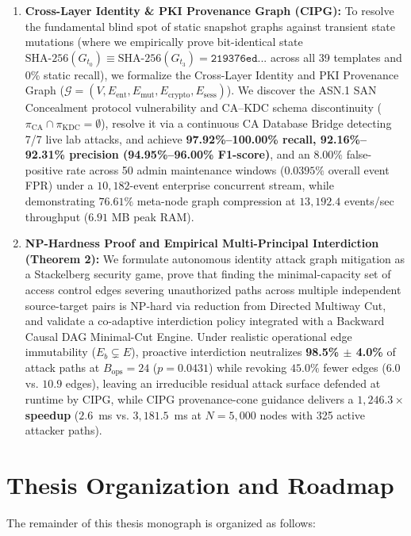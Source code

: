 \begin{enumerate}
    \item \textbf{Cross-Layer Identity \& PKI Provenance Graph (CIPG):} To resolve the fundamental blind spot of static snapshot graphs against transient state mutations (where we empirically prove bit-identical state $\text{SHA-256}(G_{t_0}) \equiv \text{SHA-256}(G_{t_3}) = \texttt{219376ed...}$ across all 39 templates and 0\% static recall), we formalize the Cross-Layer Identity and PKI Provenance Graph ($\mathcal{G} = (V, E_{\text{ent}}, E_{\text{mut}}, E_{\text{crypto}}, E_{\text{sess}})$). We discover the ASN.1 SAN Concealment protocol vulnerability and CA--KDC schema discontinuity ($\pi_{\text{CA}} \cap \pi_{\text{KDC}} = \emptyset$), resolve it via a continuous CA Database Bridge detecting 7/7 live lab attacks, and achieve \textbf{97.92\%--100.00\% recall, 92.16\%--92.31\% precision (94.95\%--96.00\% F1-score)}, and an $8.00\%$ false-positive rate across 50 admin maintenance windows ($0.0395\%$ overall event FPR) under a $10,182$-event enterprise concurrent stream, while demonstrating $76.61\%$ meta-node graph compression at $13,192.4$ events/sec throughput ($6.91$ MB peak RAM).
    \item \textbf{NP-Hardness Proof and Empirical Multi-Principal Interdiction (Theorem 2):} We formulate autonomous identity attack graph mitigation as a Stackelberg security game, prove that finding the minimal-capacity set of access control edges severing unauthorized paths across multiple independent source-target pairs is NP-hard via reduction from Directed Multiway Cut, and validate a co-adaptive interdiction policy integrated with a Backward Causal DAG Minimal-Cut Engine. Under realistic operational edge immutability ($E_b \subsetneq E$), proactive interdiction neutralizes \textbf{98.5\% $\pm$ 4.0\%} of attack paths at $B_{\text{ops}}=24$ ($p = 0.0431$) while revoking $45.0\%$ fewer edges ($6.0$ vs. $10.9$ edges), leaving an irreducible residual attack surface defended at runtime by CIPG, while CIPG provenance-cone guidance delivers a \textbf{$1,246.3\times$ speedup} ($2.6$~ms vs. $3,181.5$~ms at $N=5,000$ nodes with 325 active attacker paths).
\end{enumerate}

\section{Thesis Organization and Roadmap}
The remainder of this thesis monograph is organized as follows:

